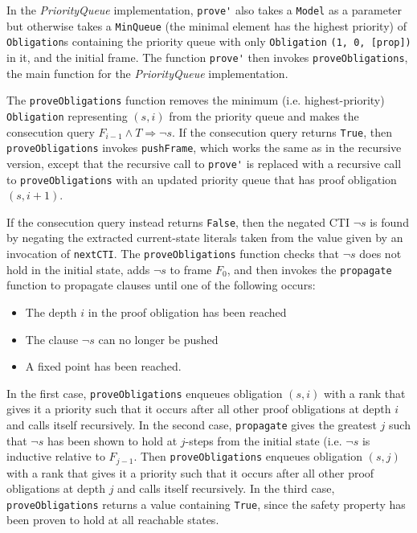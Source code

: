 \documentclass[12pt,a4paper,twoside,openright]{report}
\begin{document}
{In the \emph{PriorityQueue} implementation, \verb,prove', also takes a \verb,Model, as a parameter
but otherwise takes a \verb,MinQueue, (the minimal element has the highest
priority) of \verb,Obligation,s containing the priority queue with only \verb,Obligation,
\verb.(1, 0, [prop]). in it, and the initial frame. The function \verb,prove', then invokes \verb,proveObligations,,
the main function for the \emph{PriorityQueue} implementation.

The \verb,proveObligations, function removes the minimum (i.e. highest-priority) \verb,Obligation, 
representing $(s,i)$ from the priority queue and makes the consecution query
$F_{i - 1} \wedge T \Rightarrow \neg s$. If the consecution query returns \verb,True,,
then \verb,proveObligations, invokes \verb,pushFrame,, which works the same as in the recursive version,
except that the recursive call to \verb,prove', is replaced with a recursive call to \verb,proveObligations,
with an updated priority queue that has proof obligation $(s, i + 1)$.

If the consecution query instead returns \verb,False,, then the negated CTI $\neg s$ is found by
negating the extracted current-state literals taken from the value given by an invocation of \verb,nextCTI,.
The \verb,proveObligations, function checks that $\neg s$ does not hold in the initial state, adds $\neg s$
to frame $F_0$, and then invokes the \verb,propagate, function to propagate clauses until one of the following
occurs:
\begin{itemize}
\item The depth $i$ in the proof obligation has been reached
\item The clause $\neg s$ can no longer be pushed
\item A fixed point has been reached.
\end{itemize}
In the first case, \verb,proveObligations, enqueues obligation $(s,i)$ with a rank that gives it a priority
such that it occurs after all other proof obligations at depth $i$ and calls itself recursively.
In the second case, \verb,propagate, gives the greatest $j$ such that $\neg s$ has been shown to hold at
$j$-steps from the initial state (i.e. $\neg s$ is inductive relative to $F_{j - 1}$. Then \verb,proveObligations,
enqueues obligation $(s,j)$ with a rank that gives it a priority such that it occurs after all other
proof obligations at depth $j$ and calls itself recursively.
In the third case, \verb,proveObligations, returns a value containing \verb,True,, since the safety property
has been proven to hold at all reachable states.

}
\end{document}
